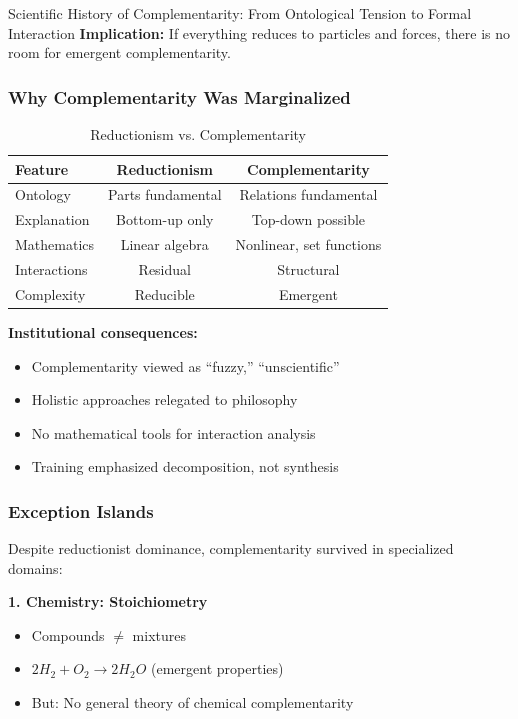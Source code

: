 \begin{chapter}{Scientific History of Complementarity: From Ontological Tension to Formal Interaction}
\textbf{Implication:} If everything reduces to particles and forces, there is no room for emergent complementarity.

\subsubsection{Why Complementarity Was Marginalized}

\begin{table}[h]
\centering
\caption{Reductionism vs. Complementarity}
\label{tab:reductionism-complementarity}
\renewcommand{\arraystretch}{1.3}
\begin{tabular}{@{}lcc@{}}
\toprule
\textbf{Feature} & \textbf{Reductionism} & \textbf{Complementarity} \\
\midrule
Ontology & Parts fundamental & Relations fundamental \\
Explanation & Bottom-up only & Top-down possible \\
Mathematics & Linear algebra & Nonlinear, set functions \\
Interactions & Residual & Structural \\
Complexity & Reducible & Emergent \\
\bottomrule
\end{tabular}
\end{table}

\textbf{Institutional consequences:}
\begin{itemize}[noitemsep]
    \item Complementarity viewed as ``fuzzy,'' ``unscientific''
    \item Holistic approaches relegated to philosophy
    \item No mathematical tools for interaction analysis
    \item Training emphasized decomposition, not synthesis
\end{itemize}

\subsubsection{Exception Islands}

Despite reductionist dominance, complementarity survived in specialized domains:

\textbf{1. Chemistry: Stoichiometry}
\begin{itemize}[noitemsep]
    \item Compounds $\neq$ mixtures
    \item $2H_2 + O_2 \to 2H_2O$ (emergent properties)
    \item But: No general theory of chemical complementarity
\end{itemize}


\end{chapter}

